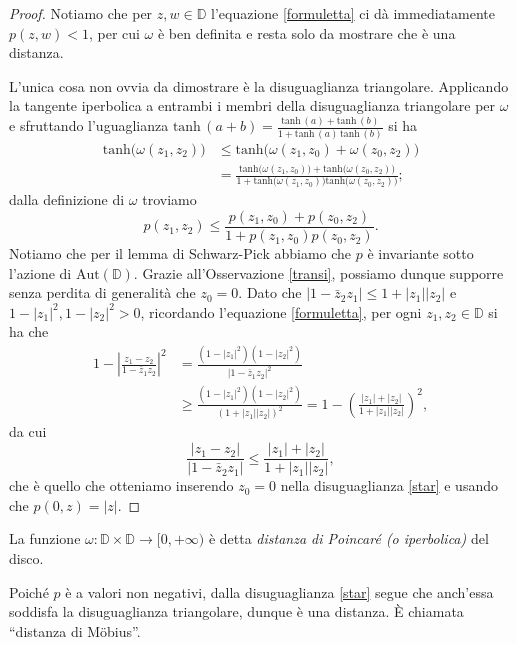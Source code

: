 \begin{proof}
  Notiamo che per $z,w \in \mathbb{D}$ l'equazione \eqref{formuletta} ci dà immediatamente $p(z,w)<1$, per cui $\omega$ è ben definita e resta solo da mostrare che è una distanza.

  L'unica cosa non ovvia da dimostrare è la disuguaglianza triangolare. Applicando la tangente iperbolica a entrambi i membri della disuguaglianza triangolare per $\omega$ e sfruttando l'uguaglianza $\text{tanh}\,(a+b)=\frac{\text{tanh}\,(a)+\text{tanh}\,(b)}{1+\text{tanh}\,(a)\,\text{tanh}\,(b)}$ si ha
  \begin{align*}
    \text{tanh}\bigl(\omega(z_1,z_2)\bigr) & \le \text{tanh}\bigl(\omega(z_1, z_0)+\omega(z_0,z_2)\bigr) \\
    &=\frac{\text{tanh}\bigl(\omega(z_1, z_0)\bigr)+\text{tanh}\bigl(\omega(z_0,z_2)\bigr)}{1+\text{tanh}\bigl(\omega(z_1, z_0)\bigr)\text{tanh}\bigl(\omega(z_0,z_2)\bigr)};
  \end{align*}
  dalla definizione di $\omega$ troviamo
  \begin{equation}
    p(z_1,z_2) \le \frac{p(z_1,z_0)+p(z_0,z_2)}{1+p(z_1,z_0)p(z_0,z_2)}. \label{star}
  \end{equation}
  Notiamo che per il lemma di Schwarz-Pick abbiamo che $p$ è invariante sotto l'azione di $\text{Aut}(\mathbb{D})$. Grazie all'Osservazione \ref{transi}, possiamo dunque supporre senza perdita di generalità che $z_0=0$. Dato che $|1-\bar{z}_2z_1| \le 1+|z_1||z_2|$ e $1-|z_1|^2, 1-|z_2|^2>0$, ricordando l'equazione \eqref{formuletta}, per ogni $z_1, z_2 \in \mathbb{D}$ si ha che
  \begin{align*}
    1-\left|\frac{z_1-z_2}{1-\bar{z}_1z_2}\right|^2 & =\frac{(1-|z_1|^2)(1-|z_2|^2)}{|1-\bar{z}_1z_2|^2} \\
    & \ge \frac{(1-|z_1|^2)(1-|z_2|^2)}{(1+|z_1||z_2|)^2}=1-\left(\frac{|z_1|+|z_2|}{1+|z_1||z_2|}\right)^2,
  \end{align*}
  da cui
  $$\frac{|z_1-z_2|}{|1-\bar{z}_2z_1|} \le \frac{|z_1|+|z_2|}{1+|z_1||z_2|},$$
  che è quello che otteniamo inserendo $z_0=0$ nella disuguaglianza \eqref{star} e usando che $p(0,z)=|z|$.
\end{proof}

\begin{defn}
  La funzione $\omega:\mathbb{D}\times \mathbb{D} \longrightarrow [0,+\infty)$ è detta \textit{distanza di Poincaré (o iperbolica)} del disco.
\end{defn}

\begin{oss}
  Poiché $p$ è a valori non negativi, dalla disuguaglianza \eqref{star} segue che anch'essa soddisfa la disuguaglianza triangolare, dunque è una distanza. È chiamata ``distanza di Möbius''.
\end{oss}

